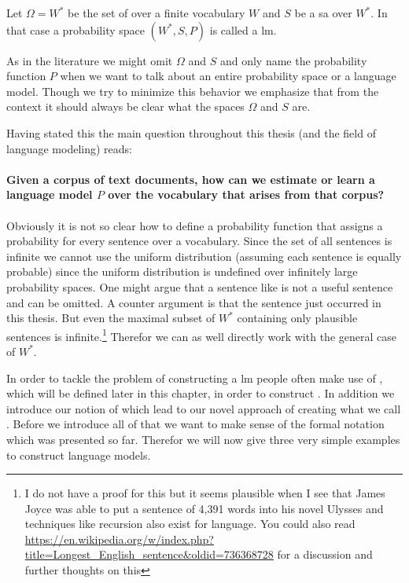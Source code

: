 \documentclass[•]{book}
\begin{document}
\begin{definition}\label{def:lm}
Let $\Omega = W^{*}$ be the set of  over a finite vocabulary $W$ and $S$ be a \gls{sa} over $W^{*}$.
In that case a probability space $(W^{*}, S, P)$ is called a \gls{lm}.
\end{definition} 

\begin{remark}
As in the literature we might omit $\Omega$ and $S$ and only name the probability function $P$ when we want to talk about an entire probability space or a language model.
Though we try to minimize this behavior we emphasize that from the context it should always be clear what the spaces $\Omega$ and $S$ are.
\end{remark}

Having stated this the main question throughout this thesis (and the field of language modeling) reads:\\
\\
\textbf{Given a corpus of text documents, how can we estimate or learn a language model $P$ over the vocabulary that arises from that corpus?} 
\\
\\
Obviously it is not so clear how to define a probability function that assigns a probability for every sentence over a vocabulary. 
Since the set of all sentences is infinite we cannot use the uniform distribution (assuming each sentence is equally probable) since the uniform distribution is undefined over infinitely large probability spaces.  
One might argue that a sentence like  is not a useful sentence and can be omitted. 
A counter argument is that the sentence just occurred in this thesis. 
But even the maximal subset of $W^{*}$ containing only plausible sentences is infinite.\footnote{I do not have a proof for this but it seems plausible when I see that James Joyce was able to put a sentence of 4,391 words into his novel Ulysses and techniques like recursion also exist for language. You could also read \url{https://en.wikipedia.org/w/index.php?title=Longest_English_sentence&oldid=736368728} for a discussion and further thoughts on this}
Therefor we can as well directly work with the general case of $W^{*}$.

In order to tackle the problem of constructing a \gls{lm} people often make use of , which will be defined later in this chapter, in order to construct . 
In addition we introduce our notion of  which lead to our novel approach of creating what we call . 
Before we introduce all of that we want to make sense of the formal notation which was presented so far.
Therefor we will now give three very simple examples to construct language models. 
\end{document}

